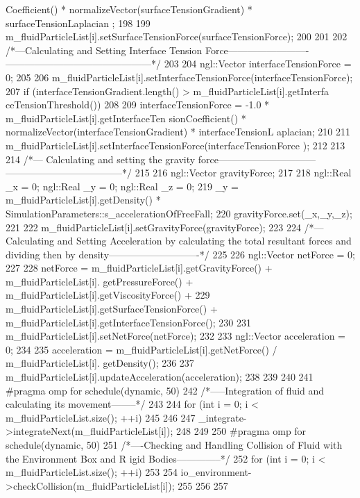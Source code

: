 \begin{DoxyCode}
{{{{      Coefficient() * normalizeVector(surfaceTensionGradient) * surfaceTensionLaplacian
      ;
198 
199             m_fluidParticleList[i].setSurfaceTensionForce(surfaceTensionForce);
200         }
201 
202     /*---Calculating and Setting Interface Tension Force-------------------------
      ---------------------------------------------*/
203 
204     ngl::Vector interfaceTensionForce = 0;
205 
206     m_fluidParticleList[i].setInterfaceTensionForce(interfaceTensionForce);
207         if (interfaceTensionGradient.length() > m_fluidParticleList[i].getInterfa
      ceTensionThreshold())
208         {
209             interfaceTensionForce = -1.0 * m_fluidParticleList[i].getInterfaceTen
      sionCoefficient() * normalizeVector(interfaceTensionGradient) * interfaceTensionL
      aplacian;
210 
211             m_fluidParticleList[i].setInterfaceTensionForce(interfaceTensionForce
      );
212         }
213 
214     /*--- Calculating and setting the gravity force------------------------------
      ------------------------------------*/
215 
216     ngl::Vector gravityForce;
217 
218     ngl::Real _x = 0; ngl::Real _y = 0; ngl::Real _z = 0;
219     _y =  m_fluidParticleList[i].getDensity() * 
      SimulationParameters::s_accelerationOfFreeFall;
220     gravityForce.set(_x,_y,_z);
221 
222     m_fluidParticleList[i].setGravityForce(gravityForce);
223 
224     /*---Calculating and Setting Acceleration by calculating the total resultant 
      forces and dividing then by density----------------------------*/
225 
226     ngl::Vector netForce = 0;
227 
228     netForce = m_fluidParticleList[i].getGravityForce() + m_fluidParticleList[i].
      getPressureForce() + m_fluidParticleList[i].getViscosityForce() +
229                m_fluidParticleList[i].getSurfaceTensionForce() + 
      m_fluidParticleList[i].getInterfaceTensionForce();
230 
231     m_fluidParticleList[i].setNetForce(netForce);
232 
233     ngl::Vector acceleration = 0;
234 
235     acceleration = m_fluidParticleList[i].getNetForce() / m_fluidParticleList[i].
      getDensity();
236 
237     m_fluidParticleList[i].updateAcceleration(acceleration);
238 
239     }
240 
241 #pragma omp for schedule(dynamic, 50)
242     /*-----Integration of fluid and calculating its movement--------*/
243 
244     for (int i = 0; i < m_fluidParticleList.size(); ++i)
245     {
246 
247             _integrate->integrateNext(m_fluidParticleList[i]);
248     }
249 
250 #pragma omp for schedule(dynamic, 50)
251     /*----Checking and Handling Collision of Fluid with the Environment Box and R
      igid Bodies--------------*/
252     for (int i = 0; i < m_fluidParticleList.size(); ++i)
253     {
254         io_environment->checkCollision(m_fluidParticleList[i]);
255     }
256 }
257 }
\end{DoxyCode}




